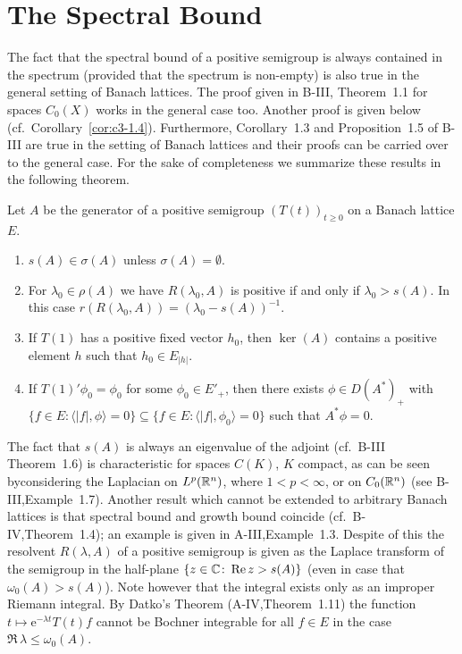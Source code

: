 \section{The Spectral Bound}\label{sec:c3-1}
The fact that the spectral bound of a positive semigroup is always contained in the spectrum (provided that the spectrum is non-empty) is also true in the general setting of Banach lattices.
The proof given in B-III, Theorem~1.1 for spaces $C_{0}(X)$ works in the general case too.
Another proof is given below (cf.\ Corollary~\ref{cor:c3-1.4}).
Furthermore, Corollary~1.3 and Proposition~1.5 of B-III are true in the setting of Banach lattices and their proofs can be carried over to the general case.
For the sake of completeness we summarize these results in the following theorem.
\begin{theorem}\label{thm:c3-1.1}
	Let $A$ be the generator of a positive semigroup $(T(t))_{t \geq 0}$ on a Banach lattice $E$.
	
	\begin{enumerate}[\upshape (i)]
		\item 
		$s(A) \in \sigma(A)$ unless $\sigma(A) = \emptyset$.
		
		\item 
		For $\lambda_{0} \in \rho(A)$ we have
		$R(\lambda_{0},A)$ is positive if and only if $\lambda_{0} > s(A)$.
		In this case $r(R(\lambda_{0},A)) = (\lambda_{0} - s(A))^{-1}$.
		
		\item 
		If $T(1)$ has a positive fixed vector $h_{0}$, then $\ker(A)$ contains a positive element $h$ such that $h_{0} \in E_{|h|}$.

		\item 
		If $T(1)'\phi_{0} = \phi_{0}$ for some $\phi_{0} \in E'_{+}$, then there exists $\phi \in D(A^*)_{+}$ with $\{f \in E \colon \langle |f|,\phi\rangle = 0\} \subseteq \{f \in E \colon \langle |f|,\phi_{0}\rangle = 0\}$ such that $A^*\phi = 0$.
	\end{enumerate}
\end{theorem}
The fact that $s(A)$ is always an eigenvalue of the adjoint (cf.\ B-III Theorem~1.6) is characteristic for spaces $C(K)$, $K$ compact, as can be seen byconsidering the Laplacian on $L^p(\mathbb{R} ^n)$, where $1 < p < \infty$, or on $C_{0}(\mathbb{R} ^n)$ (see B-III,Example~1.7).
Another result which cannot be extended to arbitrary Banach lattices is that spectral bound and growth bound coincide (cf.\ B-IV,Theorem~1.4); an example is given in A-III,Example~1.3.
Despite of this the resolvent $R(\lambda,A)$ of a positive semigroup is given as the Laplace transform of the semigroup in the half-plane $\{z \in \mathbb{C}  \colon \mathop{}\!\mathrm{Re}\, z > s(A)\}$ (even in case that $\omega_0(A) > s(A)$).
Note however that the integral exists only as an improper Riemann integral.
By Datko's Theorem (A-IV,Theorem~1.11) the function $t \mapsto \mathrm{e}^{-\lambda t}T(t)f$ cannot be Bochner integrable for all $f \in E$ in the case $\Re\, \lambda \leq \omega_0(A)$.

